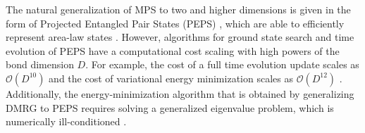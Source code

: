 The natural generalization of MPS to two and higher dimensions is given in the form of Projected Entangled Pair States (PEPS) \cite{cite:practical_introduction_MPS_and_PEPS, cite:renormalization_algorithms_for_qmb_systems_in_two_and_higher_dimensions}, which are able to efficiently represent area-law states \cite{cite:practical_introduction_MPS_and_PEPS}. However, algorithms for ground state search and time evolution of PEPS have a computational cost scaling with high powers of the bond dimension $D$. For example, the cost of a full time evolution update scales as $\mathcal{O}(D^{10})$ and the cost of variational energy minimization scales as $\mathcal{O}(D^{12})$ \cite{cite:unifying_PEPS_contractions, cite:algorithms_for_finite_PEPS}. Additionally, the energy-minimization algorithm that is obtained by generalizing DMRG to PEPS requires solving a generalized eigenvalue problem, which is numerically ill-conditioned \cite{cite:algorithms_for_finite_PEPS}. \par
